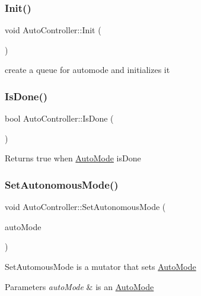 \subsubsection{\texorpdfstring{Init()}{Init()}}
{\footnotesize\ttfamily void Auto\+Controller\+::\+Init (\begin{DoxyParamCaption}{ }\end{DoxyParamCaption})}

create a queue for automode and initializes it \mbox{\label{class_auto_controller_a692f9395f78cb214ed7c410505686334}} 
\subsubsection{\texorpdfstring{Is\+Done()}{IsDone()}}
{\footnotesize\ttfamily bool Auto\+Controller\+::\+Is\+Done (\begin{DoxyParamCaption}{ }\end{DoxyParamCaption})}

\begin{DoxyReturn}{Returns}
true when \hyperlink{class_auto_mode}{Auto\+Mode} is\+Done 
\end{DoxyReturn}
\mbox{\label{class_auto_controller_a8bb1c3117bf7e528c73e4d3edd49d0ba}} 
\subsubsection{\texorpdfstring{Set\+Autonomous\+Mode()}{SetAutonomousMode()}}
{\footnotesize\ttfamily void Auto\+Controller\+::\+Set\+Autonomous\+Mode (\begin{DoxyParamCaption}\item[{\hyperlink{class_auto_mode}{Auto\+Mode} $\ast$}]{auto\+Mode }\end{DoxyParamCaption})}

Set\+Automous\+Mode is a mutator that sets \hyperlink{class_auto_mode}{Auto\+Mode} 
\begin{DoxyParams}{Parameters}
{\em auto\+Mode} & is an \hyperlink{class_auto_mode}{Auto\+Mode} \\
\hline
\end{DoxyParams}
\mbox{\label{class_auto_controller_a733fa15c9d374adcb458b0d6f0890910}} 
